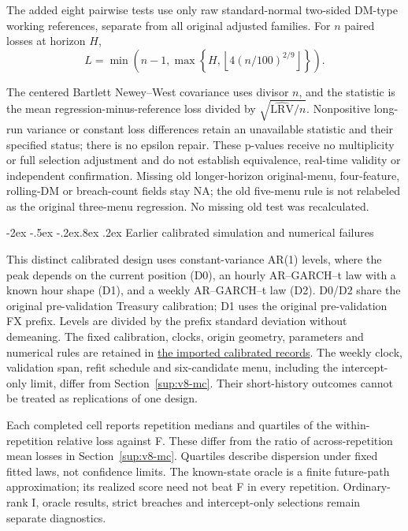 \documentclass[10pt,a4paper]{article}
\makeatletter
\renewcommand\section{\@startsection{section}{1}{\z@}%
  {-2ex \@plus -.5ex \@minus -.2ex}{.8ex \@plus .2ex}%
  {\normalfont\large\bfseries}}
\makeatother
\begin{document}
\begin{samepage}
The added eight pairwise tests use only raw standard-normal two-sided
DM-type working references, separate from all original adjusted families.
For \(n\) paired losses at horizon \(H\),
\[
L=\min\!\left(n-1,\max\!\left\{H,
\left\lfloor4(n/100)^{2/9}\right\rfloor\right\}\right).
\]
\end{samepage}
The centered Bartlett Newey--West covariance uses divisor \(n\), and the
statistic is the mean regression-minus-reference loss divided by
\(\sqrt{\widehat{\mathrm{LRV}}/n}\). Nonpositive long-run variance or constant
loss differences retain an unavailable statistic and their specified status;
there is no epsilon repair. These p-values receive no multiplicity or full
selection adjustment and do not establish equivalence, real-time validity or
independent confirmation. Missing old longer-horizon original-menu, four-feature,
rolling-DM or breach-count fields stay NA; the old five-menu rule is not relabeled
as the original three-menu regression. No missing old test was recalculated.

\section{Earlier calibrated simulation and numerical failures}\label{sup:v9-legacy-mc}

This distinct calibrated design uses constant-variance AR(1) levels, where the
peak depends on the current position (D0), an hourly AR--GARCH--t law with a
known hour shape (D1), and a weekly AR--GARCH--t law (D2).
D0/D2 share the original pre-validation Treasury calibration; D1 uses the
original pre-validation FX prefix. Levels are divided by the prefix standard
deviation without demeaning. The fixed calibration, clocks, origin geometry,
parameters and numerical rules are retained in
\href{https://github.com/ByronLi0207/financial-mathematics-paper-20261020/tree/revision-v10/results/v9/legacy-calibrated}{the imported calibrated records}.
The weekly clock, validation span, refit schedule and six-candidate menu,
including the intercept-only limit, differ from Section~\ref{sup:v8-mc}.
Their short-history outcomes cannot be treated as replications of one design.

Each completed cell reports repetition medians and quartiles of the
within-repetition relative loss against F. These differ from the ratio of
across-repetition mean losses in Section~\ref{sup:v8-mc}.
Quartiles describe dispersion under fixed fitted laws, not confidence limits.
The known-state oracle is a finite future-path approximation; its realized
score need not beat F in every repetition. Ordinary-rank I, oracle results,
strict breaches and intercept-only selections remain separate diagnostics.
\end{document}
